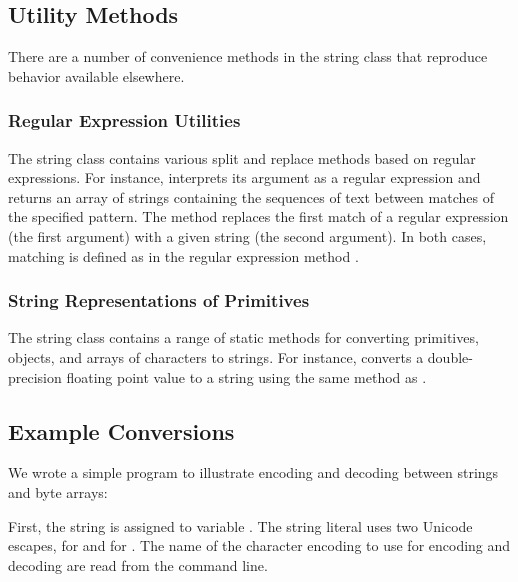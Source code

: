 \subsection{Utility Methods}

There are a number of convenience methods in the string class that
reproduce behavior available elsewhere.  

\subsubsection{Regular Expression Utilities}

The string class contains various split and replace methods based on
regular expressions.  For instance,  interprets
its argument as a regular expression and returns an array of strings
containing the sequences of text between matches of the specified
pattern.  The method  replaces the
first match of a regular expression (the first argument) with a given
string (the second argument).  In both cases, matching is defined as
in the regular expression method .

\subsubsection{String Representations of Primitives}

The string class contains a range of static 
methods for converting primitives, objects, and arrays of characters
to strings.  For instance,  converts a
double-precision floating point value to a string using the same
method as .

\subsection{Example Conversions}\label{section:example-conversions}

We wrote a simple program to illustrate encoding and decoding between
strings and byte arrays:
%

%
%
First, the string  is
assigned to variable
.  The string literal uses two Unicode escapes, 
 for  and  for 
.  The name of the character encoding to use for
encoding and decoding are read from the command line.  


